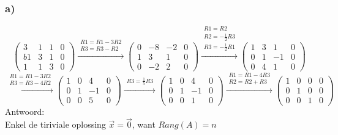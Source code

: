 \documentclass[11pt]{article}
\begin{document}
\subsubsection*{a)}
\[
\left(
\begin{array}{ccc|c}
3 & 1 & 1 & 0 \\b
1 & 3 & 1 & 0 \\
1 & 1 & 3 & 0
\end{array}
\right)
 \overset{\begin{matrix}
  R1 = R1-3R2 \\
  R3 = R3-R2
 \end{matrix}}{\rightarrow}
 \left(
\begin{array}{ccc|c}
0 & -8 & -2 & 0 \\
1 & 3 & 1 & 0 \\
0 & -2 & 2 & 0
\end{array}
\right)
 \overset{\begin{matrix}
  R1 = R2 \\
  R2 = -\frac{1}{2}R3 \\
  R3 = -\frac{1}{2}R1
 \end{matrix}}{\rightarrow}
 \left(
 \begin{array}{ccc|c}
1 & 3 & 1 & 0 \\
0 & 1 & -1 & 0 \\
0 & 4 & 1 & 0
\end{array}
\right)
\]
\[
\overset{\begin{matrix}
  R1 = R1-3R2 \\
  R3 = R3-4R2
 \end{matrix}}{\rightarrow}
 \left(
 \begin{array}{ccc|c}
1 & 0 & 4 & 0 \\
0 & 1 & -1 & 0 \\
0 & 0 & 5 & 0
\end{array}
\right)
 \overset{\begin{matrix}
  R3 = \frac{1}{5}R3
 \end{matrix}}{\rightarrow}
 \left(
 \begin{array}{ccc|c}
1 & 0 & 4 & 0 \\
0 & 1 & -1 & 0 \\
0 & 0 & 1 & 0
\end{array}
\right)
\overset{\begin{matrix}
  R1 = R1-4R3\\
  R2=R2+R3
 \end{matrix}}{\rightarrow}
 \left(
 \begin{array}{ccc|c}
1 & 0 & 0 & 0 \\
0 & 1 & 0 & 0 \\
0 & 0 & 1 & 0
\end{array}
\right)
\]
Antwoord:\\
Enkel de tiriviale oplossing $\vec{x} = \vec{0}$, want $Rang(A) = n$
\end{document}
